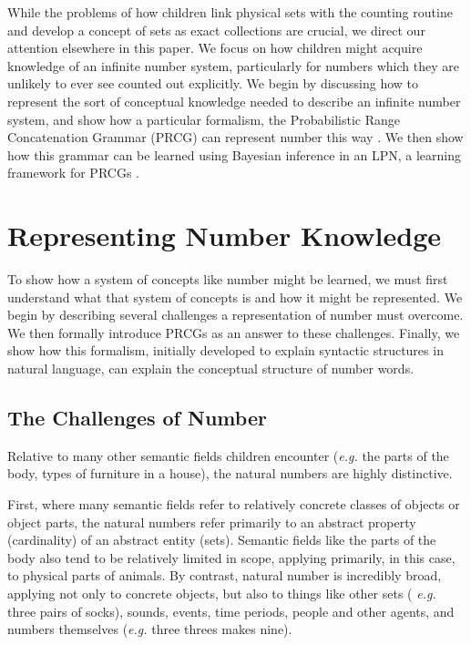 \documentclass[10pt,letterpaper]{article}
\begin{document}
While the problems of how children link physical sets with the
counting routine and develop a concept of sets as exact collections
are crucial, we direct our attention elsewhere in this paper. We focus
on how children might acquire knowledge of an infinite number system,
particularly for numbers which they are unlikely to ever see counted
out explicitly. We begin by discussing how to represent the sort of
conceptual knowledge needed to describe an infinite number system, and
show how a particular formalism, the Probabilistic Range Concatenation
Grammar (PRCG) can represent number this way
\citep{boullier2005range}. We then show how this grammar can be
learned using Bayesian inference in an LPN, a learning framework for
PRCGs \citep{DecRulTenming}.

\section{Representing Number Knowledge}

To show how a system of concepts like number might be learned, we must
first understand what that system of concepts is and how it might be
represented. We begin by describing several challenges a
representation of number must overcome. We then formally introduce
PRCGs as an answer to these challenges. Finally, we show how this
formalism, initially developed to explain syntactic structures in
natural language, can explain the conceptual structure of number
words.

\subsection{The Challenges of Number}

Relative to many other semantic fields children encounter ({\it e.g.}
the parts of the body, types of furniture in a house), the natural
numbers are highly distinctive.

First, where many semantic fields refer to relatively concrete classes
of objects or object parts, the natural numbers refer primarily to an
abstract property (cardinality) of an abstract entity (sets). Semantic
fields like the parts of the body also tend to be relatively limited
in scope, applying primarily, in this case, to physical parts of
animals. By contrast, natural number is incredibly broad, applying not
only to concrete objects, but also to things like other sets ({\it
  e.g.} three pairs of socks), sounds, events, time periods, people
and other agents, and numbers themselves ({\it e.g.} three threes
makes nine).
\end{document}
